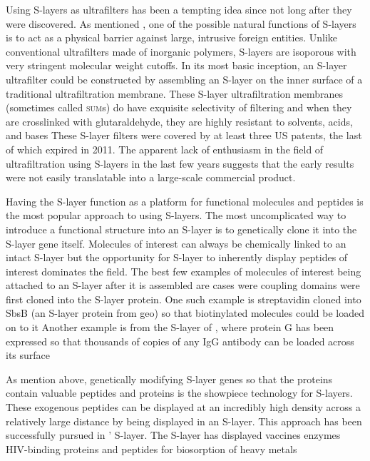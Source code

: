   Using \acp{S-layer} as ultrafilters has been a tempting idea since not long after they were discovered. As mentioned , one of the possible natural functions of \acp{S-layer} is to act as a physical barrier against large, intrusive foreign entities. Unlike conventional ultrafilters made of inorganic polymers, \acp{S-layer} are isoporous with very stringent molecular weight cutoffs. In its most basic inception, an \ac{S-layer} ultrafilter could be constructed by assembling an \ac{S-layer} on the inner surface of a traditional ultrafiltration membrane. These \ac{S-layer} ultrafiltration membranes (sometimes called \textsc{sum}s) do have exquisite selectivity of filtering and when they are crosslinked with glutaraldehyde, they are highly resistant to solvents, acids, and bases These \ac{S-layer} filters were covered by at least three US patents, the last of which expired in 2011. The apparent lack of enthusiasm in the field of ultrafiltration using \acp{S-layer} in the last few years suggests that the early results were not easily translatable into a large-scale commercial product.
  
  Having the \ac{S-layer} function as a platform for functional molecules and peptides is the most popular approach to using \acp{S-layer}. The most uncomplicated way to introduce a functional structure into an \ac{S-layer} is to genetically clone it into the \ac{S-layer} gene itself. Molecules of interest can always be chemically linked to an intact \ac{S-layer} but the opportunity for \ac{S-layer} to inherently display peptides of interest dominates the field. The best few examples of molecules of interest being attached to an \ac{S-layer} after it is assembled are cases were coupling domains were first cloned into the \ac{S-layer} protein. One such example is streptavidin cloned into SbsB (an \ac{S-layer} protein from \ac{geo}) so that biotinylated molecules could be loaded on to it Another example is from the \ac{S-layer} of \caulobacter{}, where protein G has been expressed so that thousands of copies of any IgG antibody can be loaded across its surface

  As mention above, genetically modifying \ac{S-layer} genes so that the proteins contain valuable peptides and proteins is the showpiece technology for \acp{S-layer}. These exogenous peptides can be displayed at an incredibly high density across a relatively large distance by being displayed in an \ac{S-layer}. This approach has been successfully pursued in \caulobacter{}' \ac{S-layer}. The \caulobacter{} \ac{S-layer} has displayed vaccines enzymes HIV-binding proteins and peptides for biosorption of heavy metals 


